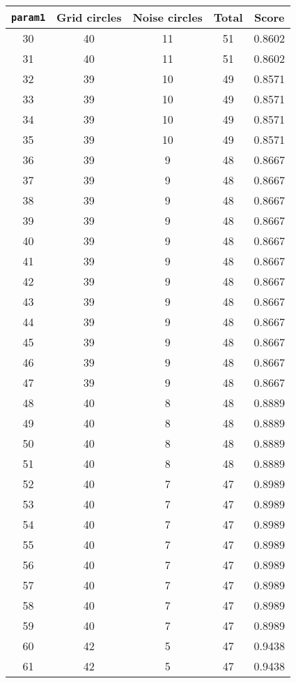 \documentclass[letterpaper, 12pt]{article}
\begin{document}
\begin{longtable}{|c|c|c|c|c|}
\hline
\textbf{\texttt{param1}} & \textbf{Grid circles} & \textbf{Noise circles} & \textbf{Total} & \textbf{Score} \\
\hline
30 & 40 & 11 & 51 & 0.8602 \\
\hline
31 & 40 & 11 & 51 & 0.8602 \\
\hline
32 & 39 & 10 & 49 & 0.8571 \\
\hline
33 & 39 & 10 & 49 & 0.8571 \\
\hline
34 & 39 & 10 & 49 & 0.8571 \\
\hline
35 & 39 & 10 & 49 & 0.8571 \\
\hline
36 & 39 & 9 & 48 & 0.8667 \\
\hline
37 & 39 & 9 & 48 & 0.8667 \\
\hline
38 & 39 & 9 & 48 & 0.8667 \\
\hline
39 & 39 & 9 & 48 & 0.8667 \\
\hline
40 & 39 & 9 & 48 & 0.8667 \\
\hline
41 & 39 & 9 & 48 & 0.8667 \\
\hline
42 & 39 & 9 & 48 & 0.8667 \\
\hline
43 & 39 & 9 & 48 & 0.8667 \\
\hline
44 & 39 & 9 & 48 & 0.8667 \\
\hline
45 & 39 & 9 & 48 & 0.8667 \\
\hline
46 & 39 & 9 & 48 & 0.8667 \\
\hline
47 & 39 & 9 & 48 & 0.8667 \\
\hline
48 & 40 & 8 & 48 & 0.8889 \\
\hline
49 & 40 & 8 & 48 & 0.8889 \\
\hline
50 & 40 & 8 & 48 & 0.8889 \\
\hline
51 & 40 & 8 & 48 & 0.8889 \\
\hline
52 & 40 & 7 & 47 & 0.8989 \\
\hline
53 & 40 & 7 & 47 & 0.8989 \\
\hline
54 & 40 & 7 & 47 & 0.8989 \\
\hline
55 & 40 & 7 & 47 & 0.8989 \\
\hline
56 & 40 & 7 & 47 & 0.8989 \\
\hline
57 & 40 & 7 & 47 & 0.8989 \\
\hline
58 & 40 & 7 & 47 & 0.8989 \\
\hline
59 & 40 & 7 & 47 & 0.8989 \\
\hline
60 & 42 & 5 & 47 & 0.9438 \\
\hline
61 & 42 & 5 & 47 & 0.9438 \\

\end{longtable}
\end{document}
